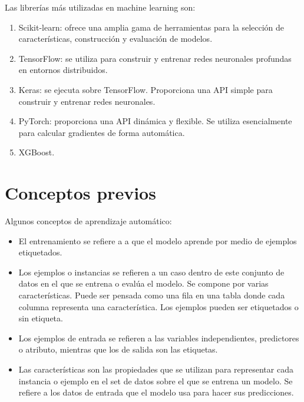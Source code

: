 \documentclass[a4paper, 12pt]{book}
\begin{document}
Las librerías más utilizadas en machine learning son:
\begin{enumerate}
	\item Scikit-learn: ofrece una amplia gama de herramientas para la selección de características, construcción y evaluación de modelos.
	\item TensorFlow: se utiliza para construir y entrenar redes neuronales profundas en entornos distribuidos.
	\item Keras: se ejecuta sobre TensorFlow. Proporciona una API simple para construir y entrenar redes neuronales.
	\item PyTorch: proporciona una API dinámica y flexible. Se utiliza esencialmente para calcular gradientes de forma automática.
	\item XGBoost.
\end{enumerate}

\section{Conceptos previos}
Algunos conceptos de aprendizaje automático:
\begin{itemize}
	\item El entrenamiento se refiere a a que el modelo aprende por medio de ejemplos etiquetados.
	\item Los ejemplos o instancias se refieren a un caso dentro de este conjunto de datos en el que se entrena o evalúa el modelo. Se compone por varias características. Puede ser pensada como una fila en una tabla donde cada columna representa una característica. Los ejemplos pueden ser etiquetados o sin etiqueta.
	\item Los ejemplos de entrada se refieren a las variables independientes, predictores o atributo, mientras que los de salida son las etiquetas.
	\item Las características son las propiedades que se utilizan para representar cada instancia o ejemplo en el set de datos sobre el que se entrena un modelo. Se refiere a los datos de entrada que el modelo usa para hacer sus predicciones.
\end{itemize}
\end{document}
